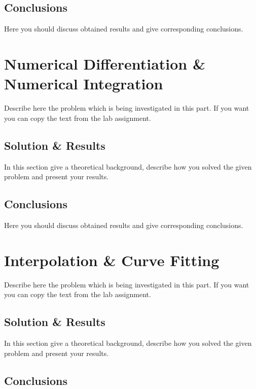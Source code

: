 \documentclass{article}
\begin{document}
\subsection{Conclusions}

Here you should discuss obtained results and give corresponding conclusions.

\newpage

\section{Numerical Differentiation \& Numerical Integration}

Describe here the problem which is being investigated in this part. If you want you can copy the text from the lab assignment.  

\subsection{Solution \& Results}

In this section give a theoretical background, describe how you solved the given problem and present your results.

\subsection{Conclusions}

Here you should discuss obtained results and give corresponding conclusions.

\newpage


\section{Interpolation \& Curve Fitting}

Describe here the problem which is being investigated in this part. If you want you can copy the text from the lab assignment.  

\subsection{Solution \& Results}

In this section give a theoretical background, describe how you solved the given problem and present your results.

\subsection{Conclusions}
\end{document}
